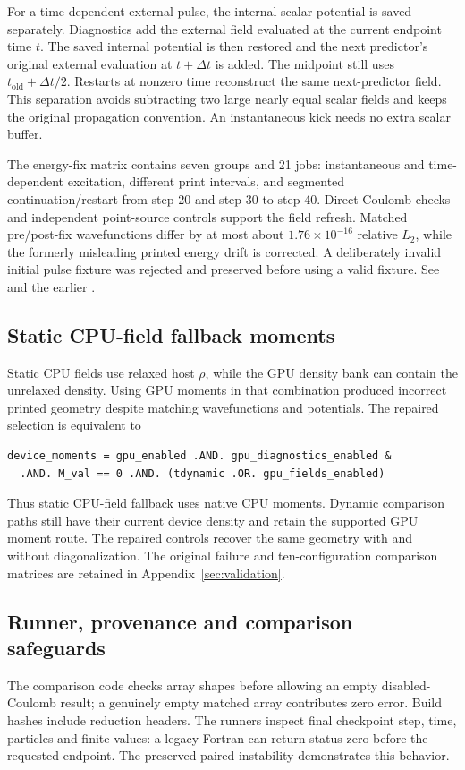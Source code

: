 \documentclass[11pt,a4paper]{article}
\newcommand{\code}[1]{\texttt{\detokenize{#1}}}
\newcommand{\ev}[1]{\path{#1.json}}
\begin{document}
For a time-dependent external pulse, the internal scalar potential is saved
separately. Diagnostics add the external field evaluated at the current
endpoint time $t$. The saved internal potential is then restored and the
next predictor's original external evaluation at $t+\Delta t$ is added.
The midpoint still uses $t_{\mathrm{old}}+\Delta t/2$. Restarts at nonzero
time reconstruct the same next-predictor field. This separation avoids
subtracting two large nearly equal scalar fields and keeps the original
propagation convention. An instantaneous kick needs no extra scalar buffer.

The energy-fix matrix contains seven groups and 21 jobs: instantaneous and
time-dependent excitation, different print intervals, and segmented
continuation/restart from step 20 and step 30 to step 40. Direct Coulomb
checks and independent point-source controls support the field refresh.
Matched pre/post-fix wavefunctions differ by at most about
$1.76\times10^{-16}$ relative $L_2$, while the formerly misleading printed
energy drift is corrected. A deliberately invalid initial pulse fixture was
rejected and preserved before using a valid fixture. See
\ev{energy-fix-validation} and the earlier
.

\subsection{Static CPU-field fallback moments}
Static CPU fields use relaxed host $\rho$, while the GPU density bank can
contain the unrelaxed density. Using GPU moments in that combination produced
incorrect printed geometry despite matching wavefunctions and potentials.
The repaired selection is equivalent to
\begin{lstlisting}
device_moments = gpu_enabled .AND. gpu_diagnostics_enabled &
  .AND. M_val == 0 .AND. (tdynamic .OR. gpu_fields_enabled)
\end{lstlisting}
Thus static CPU-field fallback uses native CPU moments. Dynamic comparison
paths still have their current device density and retain the supported GPU
moment route. The repaired controls recover the same geometry with and without
diagonalization. The original failure and ten-configuration comparison
matrices are retained in Appendix~\ref{sec:validation}.

\subsection{Runner, provenance and comparison safeguards}
The comparison code checks array shapes before allowing an empty
disabled-Coulomb result; a genuinely empty matched array contributes zero
error. Build hashes include
\code{.cuh} reduction headers. The runners inspect final checkpoint step,
time, particles and finite values: a legacy Fortran \code{STOP} can
return status zero before the requested endpoint. The preserved paired instability demonstrates this behavior.
\end{document}
